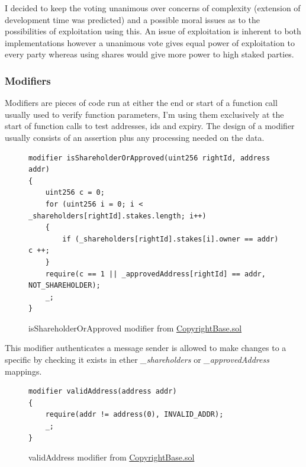 I decided to keep the voting unanimous over concerns of complexity (extension of development time was predicted) and a possible moral issues as to the possibilities of exploitation using this. An issue of exploitation is inherent to both implementations however a unanimous vote gives equal power of exploitation to every party whereas using shares would give more power to high staked parties.

\subsubsection{Modifiers}
\label{sec:modifiers}

Modifiers are pieces of code run at either the end or start of a function call usually used to verify function parameters, I'm using them exclusively at the start of function calls to test addresses, ids and expiry. The design of a modifier usually consists of an assertion plus any processing needed on the data. 

\begin{figure}[H]
\caption{isShareholderOrApproved modifier from \href{https://github.com/MrHarrisonBarker/CRPL/blob/main/CRPL.Contracts/contracts/Copyrights/CopyrightBase.sol}{CopyrightBase.sol}}
\centering
\begin{lstlisting}[language=Solidity]
modifier isShareholderOrApproved(uint256 rightId, address addr) 
{
	uint256 c = 0;
	for (uint256 i = 0; i < _shareholders[rightId].stakes.length; i++) 
	{
		if (_shareholders[rightId].stakes[i].owner == addr) c ++;
	}
	require(c == 1 || _approvedAddress[rightId] == addr, NOT_SHAREHOLDER);
	_;
}
\end{lstlisting}
\end{figure}

This modifier authenticates a message sender is allowed to make changes to a specific  by checking it exists in ether \textit{\_shareholders} or \textit{\_approvedAddress} mappings.

\begin{figure}[H]
\caption{validAddress modifier from \href{https://github.com/MrHarrisonBarker/CRPL/blob/main/CRPL.Contracts/contracts/Copyrights/CopyrightBase.sol}{CopyrightBase.sol}}
\centering
\begin{lstlisting}[language=Solidity]
modifier validAddress(address addr)
{
	require(addr != address(0), INVALID_ADDR);
	_;
}
\end{lstlisting}
\end{figure}

